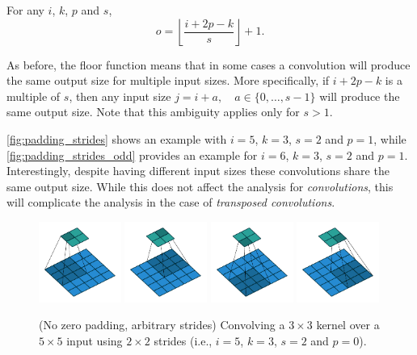 \begin{relationship}\label{rel:padding_strides}
For any $i$, $k$, $p$ and $s$,
\begin{equation*}
    o = \left\lfloor \frac{i + 2p - k}{s} \right\rfloor + 1.
\end{equation*}
\end{relationship}

\noindent As before, the floor function means that in some cases a convolution
will produce the same output size for multiple input sizes. More specifically,
if $i + 2p - k$ is a multiple of $s$, then any input size $j = i + a, \quad a
\in \{0,\ldots,s - 1\}$ will produce the same output size. Note that this
ambiguity applies only for $s > 1$.

\autoref{fig:padding_strides} shows an example with $i = 5$, $k = 3$, $s = 2$
and $p = 1$, while \autoref{fig:padding_strides_odd} provides an example for
$i = 6$, $k = 3$, $s = 2$ and $p = 1$. Interestingly, despite having different
input sizes these convolutions share the same output size. While this does not
affect the analysis for {\em convolutions}, this will complicate the analysis
in the case of {\em transposed convolutions}.

\begin{figure}[p]
    \centering
    \includegraphics[width=0.24\textwidth]{pdf/no_padding_strides_00.pdf}
    \includegraphics[width=0.24\textwidth]{pdf/no_padding_strides_01.pdf}
    \includegraphics[width=0.24\textwidth]{pdf/no_padding_strides_02.pdf}
    \includegraphics[width=0.24\textwidth]{pdf/no_padding_strides_03.pdf}
    \caption{\label{fig:no_padding_strides} (No zero padding, arbitrary
        strides) Convolving a $3 \times 3$ kernel over a $5 \times 5$ input
        using $2 \times 2$ strides (i.e., $i = 5$, $k = 3$, $s = 2$ and
        $p = 0$).}
\end{figure}

